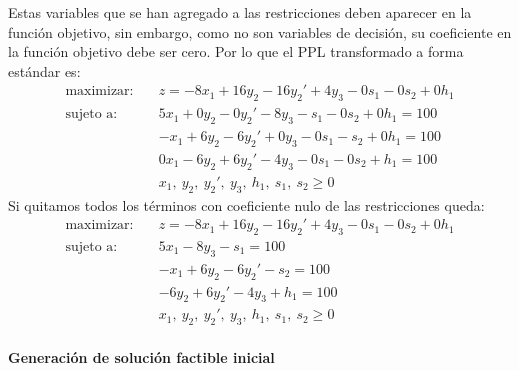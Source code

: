 Estas variables que se han agregado a las restricciones deben aparecer en la función objetivo, sin embargo, como no son variables de decisión, su coeficiente en la función objetivo debe ser cero. Por lo que el PPL transformado a forma estándar es:
\begin{align*}
  \text{maximizar:} \quad   &z = -8x_1 + 16y_2 - 16y_2' + 4y_3 - 0s_1 - 0s_2 + 0h_1 \\[3pt]
  \text{sujeto a:} \quad    &5x_1 + 0y_2 - 0y_2' - 8y_3 - s_1 - 0s_2 + 0h_1 = 100 \\
                            &-x_1 + 6y_2 - 6y_2' + 0y_3 - 0s_1 - s_2 + 0h_1 = 100 \\
                            &0x_1 -6y_2 + 6y_2' - 4y_3 - 0s_1 - 0s_2 + h_1 = 100 \\
                            &x_1,\ y_2,\ y_2',\ y_3,\ h_1,\ s_1,\ s_2 \geq 0
\end{align*}
Si quitamos todos los términos con coeficiente nulo de las restricciones queda:
\begin{align*}
  \text{maximizar:} \quad   &z = -8x_1 + 16y_2 - 16y_2' + 4y_3 - 0s_1 - 0s_2 + 0h_1 \\[3pt]
  \text{sujeto a:} \quad    &5x_1 - 8y_3 - s_1 = 100 \\
                            &-x_1 + 6y_2 - 6y_2' - s_2 = 100 \\
                            &-6y_2 + 6y_2' - 4y_3 + h_1 = 100 \\
                            &x_1,\ y_2,\ y_2',\ y_3,\ h_1,\ s_1,\ s_2 \geq 0
\end{align*}

\paragraph{Generación de solución factible inicial}

